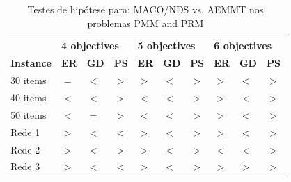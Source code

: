 \begin{table}[htb]
	\centering
	\def\arraystretch{1.0}
	\caption{Testes de hipótese para: MACO/NDS vs. AEMMT nos problemas PMM and PRM}
	\label{tab_ztest_meamt}
	\begin{tabular}{llllllllll}
		& \multicolumn{3}{l}{\textbf{4 objectives}} & \multicolumn{3}{l}{\textbf{5 objectives}} & \multicolumn{3}{l}{\textbf{6 objectives
		}} \\
		\textbf{Instance} & \textbf{ER} & \textbf{GD} & \textbf{PS} & \textbf{ER} & \textbf{GD} & \textbf{PS} & \textbf{ER} & \textbf{GD} & \textbf{PS} \\ \hline
		30 items & \cellcolor{white} $=$ & \cellcolor{table-green} $<$ & \cellcolor{table-green} $>$ & \cellcolor{table-red} $>$ & \cellcolor{table-green} $<$ & \cellcolor{table-green} $>$ & \cellcolor{table-red} $>$ & \cellcolor{table-green} $<$ & \cellcolor{table-green} $>$ \\
		40 items & \cellcolor{table-green} $<$ & \cellcolor{table-green} $<$ & \cellcolor{table-green} $>$ & \cellcolor{table-green} $<$ & \cellcolor{table-green} $<$ & \cellcolor{table-green} $>$ & \cellcolor{table-red} $>$ & \cellcolor{table-green} $<$ & \cellcolor{table-green} $>$ \\
		50 items & \cellcolor{table-green} $<$ & \cellcolor{white} $=$ & \cellcolor{table-green} $>$ & \cellcolor{table-green} $<$ & \cellcolor{table-green} $<$ & \cellcolor{table-green} $>$ & \cellcolor{table-red} $>$ & \cellcolor{table-green} $<$ & \cellcolor{table-green} $>$ \\  \hline 
		Rede 1 & \cellcolor{table-red} $>$ & \cellcolor{table-green} $<$ & \cellcolor{table-red} $<$ & \cellcolor{table-red} $>$ & \cellcolor{table-green} $<$ & \cellcolor{table-green} $>$ & \cellcolor{table-red} $>$ & \cellcolor{table-green} $<$ & \cellcolor{table-green} $>$ \\
		Rede 2 & \cellcolor{table-red} $>$ & \cellcolor{table-green} $<$ & \cellcolor{table-green} $>$ & \cellcolor{table-red} $>$ & \cellcolor{table-green} $<$ & \cellcolor{table-green} $>$ & \cellcolor{table-green} $<$ & \cellcolor{table-green} $<$ & \cellcolor{table-green} $>$ \\
		Rede 3 & \cellcolor{table-red} $>$ & \cellcolor{table-green} $<$ & \cellcolor{table-red} $<$ & \cellcolor{table-red} $>$ & \cellcolor{table-green} $<$ & \cellcolor{table-green} $>$ & \cellcolor{table-red} $>$ & \cellcolor{table-red} $>$ & \cellcolor{table-green} $>$ \\  \hline 
	\end{tabular}
\end{table}

